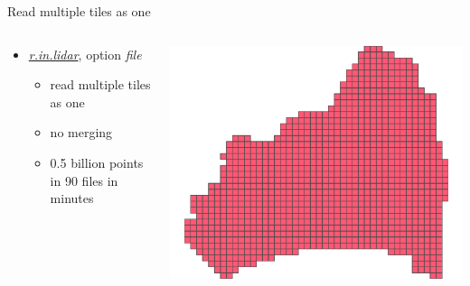 \documentclass[xcolor={dvipsnames,usenames},beamer,aspectratio=169]{beamer}
\newcommand{\gmodule}[1]{\href{http://grass.osgeo.org/grass71/manuals/#1.html}{\emph{#1}}}
\begin{document}
\begin{frame}{Read multiple tiles as one}

\begin{columns}
\begin{column}{0.45\textwidth}

 \begin{itemize}
  \item \gmodule{r.in.lidar}, option \textit{file}
    \begin{itemize}
    \item read multiple tiles as one
    \item no merging
    \item 0.5 billion points in 90 files in minutes
    \end{itemize}
\end{itemize}

\end{column}
\begin{column}{0.54\textwidth}

\begin{center}
  \includegraphics[width=\textwidth]{features/tiles}
\end{center}

\end{column}
\end{columns}

\end{frame}
\end{document}

